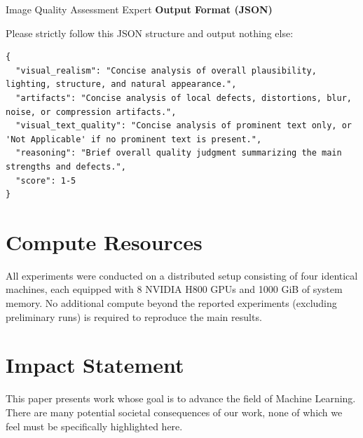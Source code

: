 \begin{promptbox}[label={System Prompts: Visual Quality}]{Image Quality Assessment Expert}
\textbf{Output Format (JSON)}

Please strictly follow this JSON structure and output nothing else:

\begin{lstlisting}
{
  "visual_realism": "Concise analysis of overall plausibility, lighting, structure, and natural appearance.",
  "artifacts": "Concise analysis of local defects, distortions, blur, noise, or compression artifacts.",
  "visual_text_quality": "Concise analysis of prominent text only, or 'Not Applicable' if no prominent text is present.",
  "reasoning": "Brief overall quality judgment summarizing the main strengths and defects.",
  "score": 1-5
}
\end{lstlisting}

\end{promptbox}

\section{Compute Resources}
\label{supp:ComputeResources}
All experiments were conducted on a distributed setup consisting of four identical machines, each equipped with 8 NVIDIA H800 GPUs and 1000 GiB of system memory. No additional compute beyond the reported experiments (excluding preliminary runs) is required to reproduce the main results.

\section{Impact Statement}
\label{supp:impact}
This paper presents work whose goal is to advance the field of Machine Learning. There are many potential societal consequences of our work, none of which we feel must be specifically highlighted here.